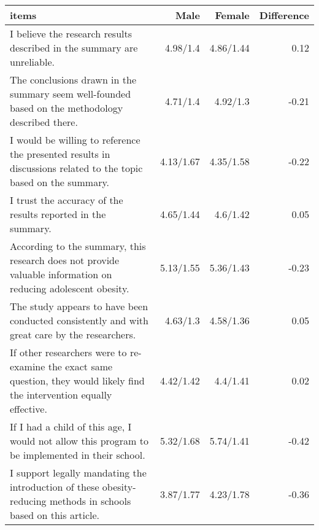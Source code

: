 \begin{longtable}{lrrr}
\toprule
items & Male & Female & Difference \\ 
\midrule\addlinespace[2.5pt]
I believe the research results described in the summary are unreliable. & 4.98/1.4 & 4.86/1.44 & 0.12 \\ 
The conclusions drawn in the summary seem well-founded based on the methodology described there. & 4.71/1.4 & 4.92/1.3 & -0.21 \\ 
I would be willing to reference the presented results in discussions related to the topic based on the summary. & 4.13/1.67 & 4.35/1.58 & -0.22 \\ 
I trust the accuracy of the results reported in the summary. & 4.65/1.44 & 4.6/1.42 & 0.05 \\ 
According to the summary, this research does not provide valuable information on reducing adolescent obesity. & 5.13/1.55 & 5.36/1.43 & -0.23 \\ 
The study appears to have been conducted consistently and with great care by the researchers. & 4.63/1.3 & 4.58/1.36 & 0.05 \\ 
If other researchers were to re-examine the exact same question, they would likely find the intervention equally effective. & 4.42/1.42 & 4.4/1.41 & 0.02 \\ 
If I had a child of this age, I would not allow this program to be implemented in their school. & 5.32/1.68 & 5.74/1.41 & -0.42 \\ 
I support legally mandating the introduction of these obesity-reducing methods in schools based on this article. & 3.87/1.77 & 4.23/1.78 & -0.36 \\ 
\bottomrule
\end{longtable}

